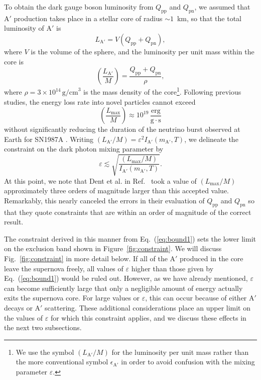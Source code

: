 \documentclass[nofootinbib,prd,superscriptaddress,twocolumn]{revtex4}
\newcommand{\Aprime}{\mathrm{A}'}
\begin{document}
To obtain the dark gauge boson luminosity from $Q_{\mathrm{pp}}$ and $Q_{\mathrm{pn}}$, 
we assumed that $\Aprime$ production takes place in a stellar core of radius $\sim 1$~km, 
so that the total luminosity of $\Aprime$ is 
%
\begin{equation}
L_{\mathrm{A}'} = V (Q_{\mathrm{pp}} + Q_{\mathrm{pn}}),
\end{equation}
%
where $V$ is the volume of the sphere, and the luminosity per unit mass within the core is 
%
\begin{equation}
\left( \frac{L_{\mathrm{A'}}}{M} \right) = \frac{Q_{\mathrm{pp}} + Q_{\mathrm{pn}}}{\rho}, 
\end{equation}
%
where $\rho = 3 \times 10^{14}\, \mathrm{g/cm}^3$ is the mass density of the core\footnote{
We use the symbol $\left( L_{\mathrm{A'}}/M \right)$ for the luminosity per unit mass rather than 
the more conventional symbol $\epsilon_{\mathrm{A'}}$ in order to avoid confusion with the 
mixing parameter $\varepsilon$.}. Following previous studies, the energy loss rate into novel 
particles cannot exceed 
%
\begin{equation}
\left( \frac{L_{\mathrm{max}}}{M} \right) \approx 10^{19} \, \frac{\mathrm{erg}}{\mathrm{g}\cdot \mathrm{s}}
\end{equation}
%
without significantly reducing the duration of the neutrino burst observed at Earth for SN1987A 
\cite{raffelt96_book}. Writing $(L_{\mathrm{A'}}/M) = \varepsilon^2 I_{\mathrm{A'}}(m_{\mathrm{A'}},T)$, 
we delineate the constraint on the dark photon mixing parameter by 
%
\begin{equation}
\label{eq:bound1}
\varepsilon \lesssim \sqrt{\frac{(L_{\mathrm{max}}/M)}{I_{\mathrm{A}'}(m_{\mathrm{A}'}, T)}}.
\end{equation}
%
At this point, we note that Dent et al. in Ref.~\cite{dent_etal12} took a value of 
$(L_{\mathrm{max}}/M)$ approximately three orders of magnitude larger than 
this accepted value. Remarkably, this nearly canceled the errors in their evaluation of 
$Q_{\mathrm{pp}}$ and $Q_{\mathrm{pn}}$ so that they quote constraints that are 
within an order of magnitude of the correct result.


The constraint derived in this manner from Eq.~(\ref{eq:bound1}) sets the lower limit on the 
exclusion band shown in Figure~\ref{fig:constraint}. We will discuss Fig.~\ref{fig:constraint} 
in more detail below. If all of the $\Aprime$ produced in the core leave the supernova freely, all 
values of $\varepsilon$ higher than those given by Eq.~(\ref{eq:bound1}) would be ruled out. 
However, as we have already mentioned, $\varepsilon$ can become sufficiently large that only a 
negligible amount of energy actually exits the supernova core. For large values or $\varepsilon$, 
this can occur because of either $\Aprime$ decays or $\Aprime$ scattering. These additional considerations place 
an upper limit on the values of $\varepsilon$ for which this constraint applies, 
and we discuss these effects in the next two subsections.
\end{document}
